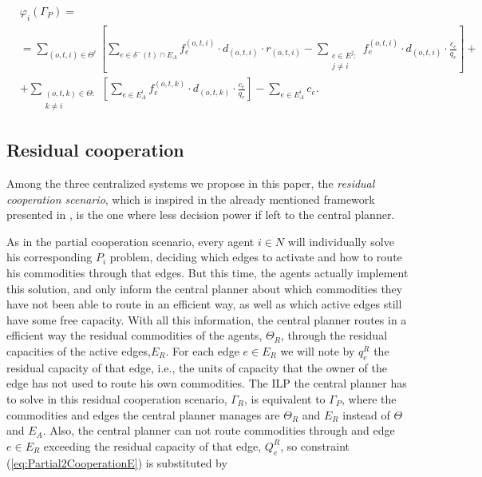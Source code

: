 \documentclass[review]{elsarticle}
\begin{document}
\begin{equation}
    \begin{split}
    & \varphi_i(\Gamma_P) =\label{eq:PartialCooperationPayoff} \\
    & = \sum_{(o,t,i)\in \Theta^i} \left[ \sum_{e \in \delta^-(t)\cap E_A} f_e^{(o,t,i)} \cdot d_{(o,t,i)} \cdot r_{(o,t,i)} -  \sum_{\substack{e\in E^j \colon\\ j\not = i}} f_e^{(o,t,i)} \cdot d_{(o,t,i)} \cdot \frac{c_e}{q_e} \right] + \\
    & + \sum_{\substack{(o,t,k) \in \Theta  \colon \\ k \not = i}} \left[\sum_{e \in E_A^i} f_e^{(o,t,k)} \cdot d_{(o,t,k)} \cdot \frac{c_e}{q_e}\right] - \sum_{e \in E_A^i} c_e.
    \end{split}
\end{equation}

\subsection{Residual cooperation}

Among the three centralized systems we propose in this paper, the
\emph{residual cooperation scenario}, which is inspired in the already mentioned framework presented in \cite{ANUPINDI2001}, is the one where less decision power if left to the central planner.

As in the partial cooperation scenario, every agent $i\in N$ will individually solve his corresponding $P_i$ problem, deciding which edges to activate and how to route his commodities through that edges. But this time, the agents actually implement this solution, and only inform the central planner about which commodities they have not been able to route in an efficient way, as well as which active edges still have some free capacity. With all this information, the central planner routes in a efficient way the residual commodities of the agents, $\Theta_R$, through the residual capacities of the active edges,$E_R$. For each edge $e \in E_R$ we will note by $q_e^R$ the residual capacity of that edge, i.e., the units of capacity that the owner of the edge has not used to route his own commodities. The ILP the central planner has to solve in this residual cooperation scenario, $\Gamma_R$, is equivalent to $\Gamma_P$, where the commodities and edges the central planner manages are $\Theta_R$ and $E_R$ instead of $\Theta$ and $E_A$. Also, the central planner can not route commodities through and edge $e\in E_R$ exceeding the residual capacity of that edge, $Q_e^R$, so constraint (\ref{eq:Partial2CooperationE}) is substituted by
\end{document}
